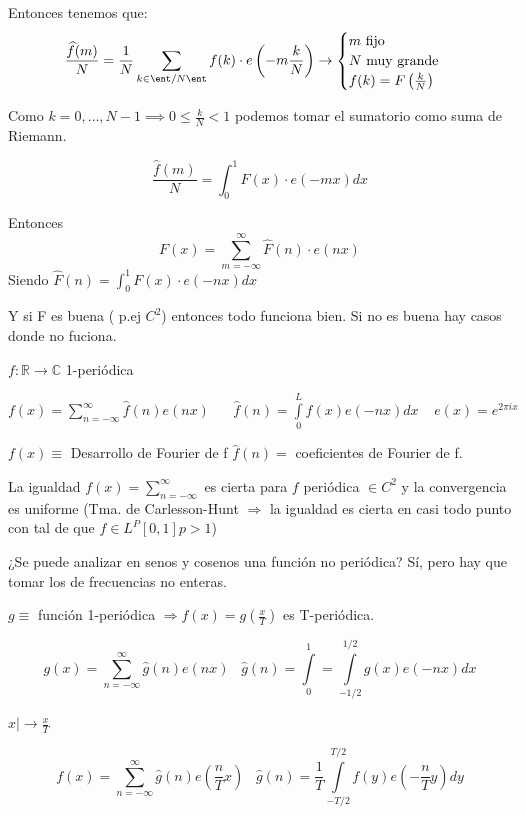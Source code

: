 Entonces tenemos que:
$$\frac{\widehat{f}(m)}{N} = \frac{1}{N} \sum_{k \in \ent/N\ent} f(k) \cdot e\left(-m \frac{k}{N}\right) \rightarrow \begin{cases}
	m \text{ fijo}\\
	N \text{ muy grande}\\
	f(k) = F\left(\frac{k}{N}\right)\\
\end{cases}$$

Como $ k = 0 , \ldots , N-1 \implies 0\leq \frac{k}{N} < 1$ podemos tomar el sumatorio como suma de Riemann.

$$\frac{\widehat{f}(m)}{N} = \int_{0}^{1} F(x) \cdot e(-mx) dx$$

Entonces
$$F(x) = \sum_{m= -\infty}^{\infty} \widehat{F}(n) \cdot e(nx)$$
Siendo $\widehat{F}(n) = \int_{0}^{1} F(x) \cdot e(-nx) dx$

Y si F es buena ( p.ej $C^2$) entonces todo funciona bien.
Si no es buena hay casos donde no fuciona.






$ f: \mathbb{R} \rightarrow \mathbb{C} $ 1-periódica

$f(x) = \sum\limits_{n=-\infty}^{\infty} \hat{f}(n) e(nx) \;\;\;\;\;\; \hat{f}(n) = \int\limits_{0}^{L} f(x) e (-nx) dx \;\;\;\; e(x) = e^{2 \pi i x}$

$f(x) \equiv $ Desarrollo de Fourier de f \;\;\;\; $\hat{f}(n) =$ coeficientes de Fourier de f.

La igualdad $f(x) = \sum^{\infty}_{n=-\infty}$ es cierta para $f$ periódica $\in C^{2}$ y la convergencia es uniforme (Tma. de Carlesson-Hunt $\Rightarrow$ la igualdad es cierta en casi todo punto con tal de que $f \in L^{P} [0,1] p > 1$)

¿Se puede analizar en senos y cosenos una función no periódica? Sí, pero hay que tomar los de frecuencias no enteras.

$g \equiv $ función 1-periódica $ \Rightarrow f(x) = g(\frac{x}{T})$ es T-periódica.

$$ g(x) = \sum^{\infty}_{n=-\infty} \hat{g}(n) e(nx) \;\;\; \hat{g}(n) = \int\limits^{1}_{0} = \int\limits^{1/2}_{-1/2} g(x) e(-nx) dx $$

$x |\rightarrow \frac{x}{T} $

$$f(x) = \sum_{n = -\infty}^{\infty} \hat{g}(n) e(\frac{n}{T}x) \;\;\; \hat{g}(n) = \frac{1}{T} \int\limits^{T/2}_{-T/2} f(y) e(-\frac{n}{T}y) dy$$

